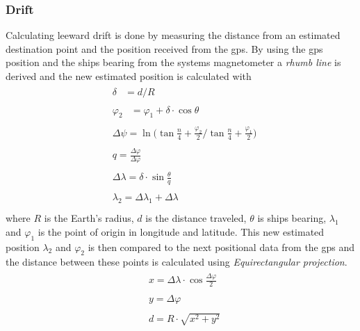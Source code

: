 \subsubsection{Drift}
Calculating leeward drift is done by measuring the distance from an estimated destination point and the position received from the \gls{gps}. By using the \gls{gps} position and the ships bearing from the systems magnetometer a \textit{rhumb line}\cite{rhumb-line} is derived and the new estimated position is calculated with
\begin{align*}
  &\begin{aligned}
  \delta &= d/R 
  \end{aligned}\\
 &\begin{aligned}
  \varphi_2 &= \varphi_1 + \delta \cdot \cos{\theta}
  \end{aligned}\\
 &\begin{aligned}
  \Delta\psi = \ln { \bigg( \tan{\frac{n}{4} + \frac{\varphi_2}{2}} \bigg/ \tan{\frac{n}{4} + \frac{\varphi_1}{2}} \bigg)}
  \end{aligned}\\
 &\begin{aligned}
  q = \frac{\Delta\varphi}{\Delta\varphi}
  \end{aligned}\\
 &\begin{aligned}
  \Delta\lambda = \delta\cdot\sin\frac{\theta}{q}
  \end{aligned}\\
 &\begin{aligned}
  \lambda_2 = \Delta\lambda_1 + \Delta\lambda
  \end{aligned}\\
\end{align*}
where $R$ is the Earth's radius, $d$ is the distance traveled, $\theta$ is ships bearing, $\lambda_1$ and $\varphi_1$ is the point of origin in longitude and latitude. This new estimated position $\lambda_2$ and $\varphi_2$ is then compared to the next positional data from the \gls{gps} and the distance between these points is calculated using \emph{Equirectangular projection}\cite{equirectangular}.
\begin{align*}
  &\begin{aligned}
  x = \Delta\lambda \cdot \cos\frac{\Delta\varphi}{2}
  \end{aligned}\\
 &\begin{aligned}
  y = \Delta\varphi
  \end{aligned}\\
 &\begin{aligned}
  d = R\cdot\sqrt{x^2+y^2}
  \end{aligned}\\
\end{align*}
